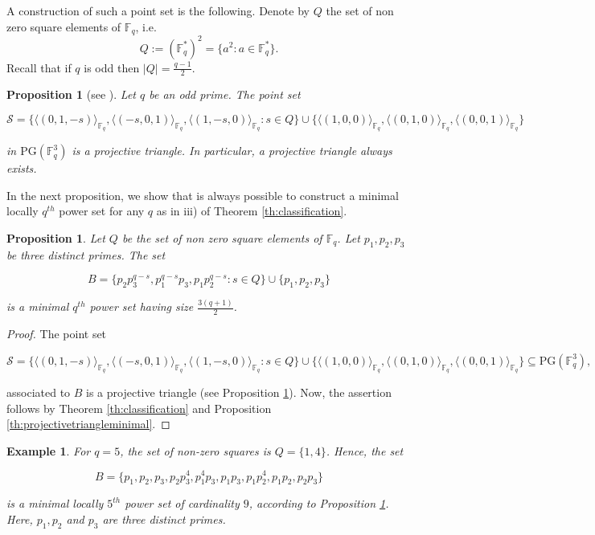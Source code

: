 \documentclass[12pt]{amsart}
\newtheorem{proposition}[theorem]{Proposition}
\newtheorem{example}[theorem]{Example}
\newcommand{\F}{{\mathbb F}}
\newcommand{\fq}{{\mathbb F}_{q}}
\newcommand{\PG}{\mathrm{PG}}
\begin{document}
A construction of such a point set is the following. Denote by $Q$ the set of non zero square elements of $\fq$, i.e.
\[
Q:=(\fq^*)^2=\{a^2 \colon a \in \fq^*\}.
\]
Recall that if $q$ is odd then $\lvert Q \rvert=\frac{q-1}{2}$.  
\begin{proposition} [see \textnormal{\cite[Lemma 13.6 (i)]{hirschfeld1998projective}}] \label{th:constructionprojectivetriangle}
Let $q$ be an odd prime. The point set
\begin{small}
\[
\mathcal{S}=\{\langle (0, 1, -s) \rangle_{\fq},\langle(-s, 0, 1)\rangle_{\fq},\langle (1, -s, 0) \rangle_{\fq} \colon s \in Q\} \cup \{\langle (1, 0, 0) \rangle_{\fq},\langle(0, 1, 0)\rangle_{\fq},\langle (0, 0, 1) \rangle_{\fq}\}
\]
\end{small} 
in $\PG(\F_{q}^{3})$ is a projective triangle. In particular, a projective triangle always exists.
\end{proposition}

In the next proposition, we show that is always possible to construct a minimal locally $q^{th}$ power set for any $q$ as in iii) of Theorem \ref{th:classification}. 
\begin{proposition} \label{th:constructionsecondminimalqthpower}
Let $Q$ be the set of non zero square elements of $\fq$. Let $p_1,p_2,p_3$ be three distinct primes. 
The set
\begin{small}
\[
B=\{p_2p_3^{q-s}, p_1^{q-s}p_3,p_1p_2^{q-s} \colon s \in Q\} \cup \{p_1,p_2,p_3\}
\]
\end{small} 
is a minimal $q^{th}$ power set having size $\frac{3(q+1)}{2}$.
\end{proposition}

\begin{proof} 
The point set
\begin{small}
\[
\mathcal{S}=\{\langle (0, 1, -s) \rangle_{\fq},\langle(-s, 0, 1)\rangle_{\fq},\langle (1, -s, 0) \rangle_{\fq} \colon s \in Q\} \cup \{\langle (1, 0, 0) \rangle_{\fq},\langle(0, 1, 0)\rangle_{\fq},\langle (0, 0, 1) \rangle_{\fq}\} \subseteq \PG(\F_{q}^{3}),
\]
\end{small} 
associated to $B$ is a projective triangle (see Proposition \ref{th:constructionprojectivetriangle}). Now, the assertion follows by Theorem \ref{th:classification} and Proposition \ref{th:projectivetriangleminimal}.
\end{proof}

\begin{example}
For $q=5$, the set of non-zero squares is $Q=\{1,4\}$. Hence, the set
\begin{small}
\[
B=\{p_1,p_2,p_3,p_2p_3^{4}, p_1^{4}p_3,p_1p_3,p_1p_2^{4},p_1p_2, p_{2}p_{3} \} 
\]
\end{small} 
is a minimal locally $5^{th}$ power set of cardinality $9$, according to Proposition \ref{th:constructionsecondminimalqthpower}. Here, $p_{1}, p_{2}$ and $p_{3}$ are three distinct primes. 
\end{example}
\end{document}
